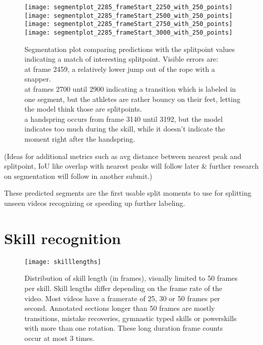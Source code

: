 \begin{figure}
    \centering
    \texttt{[image: segmentplot\_2285\_frameStart\_2250\_with\_250\_points]}
    \texttt{[image: segmentplot\_2285\_frameStart\_2500\_with\_250\_points]}
    \texttt{[image: segmentplot\_2285\_frameStart\_2750\_with\_250\_points]}
    \texttt{[image: segmentplot\_2285\_frameStart\_3000\_with\_250\_points]}
    \caption[Segmentation plot]{Segmentation plot comparing predictions with the splitpoint values indicating a match of interesting splitpoint. Visible errors are: \\
        at frame 2459, a relatively lower jump out of the rope with a snapper. \\
        at frames 2700 until 2900 indicating a transition which is labeled in one segment, but the athletes are rather bouncy on their feet, letting the model think those are splitpoints. \\
        a handspring occurs from frame 3140 until 3192, but the model indicates too much during the skill, while it doesn't indicate the moment right after the handspring.
    }
    \label{fig:segmentation-plot}
\end{figure}

(Ideas for additional metrics such as avg distance between nearest peak and splitpoint, IoU like overlap with nearest peaks will follow later \& further research on segmentation will follow in another submit.)

These predicted segments are the first usable split moments to use for splitting unseen videos recognizing or speeding up further labeling.


\section{Skill recognition}
\label{results:skill-recognition}

\begin{figure}
    \centering
    \texttt{[image: skilllengths]}
    \caption[frame counts of skill lengths]{Distribution of skill length (in frames), visually limited to 50 frames per skill. Skill lengths differ depending on the frame rate of the video. Most videos have a framerate of 25, 30 or 50 frames per second. Annotated sections longer than 50 frames are mostly transitions, mistake recoveries, gymnastic typed skills or powerskills with more than one rotation. These long duration frame counts occur at most 3 times.}
    \label{fig:skilllengths-counts}
\end{figure}


